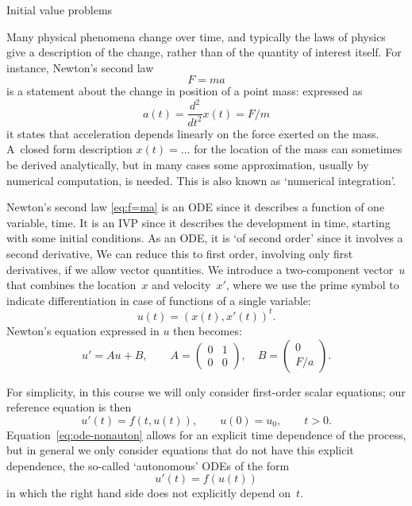  {Initial value problems}
\label{sec:ode}

Many physical phenomena change over time, and typically the laws of
physics give a description of the change, rather than of the quantity
of interest itself. For instance, Newton's second law
\begin{equation}
  F=ma
  \label{eq:f=ma}
\end{equation}
is a
statement about the change in position of a point mass: expressed as
\begin{equation}
  a(t)=\frac{d^2}{dt^2}x(t)=F/m
\end{equation}
it states that acceleration depends linearly on the force exerted on
the mass. A~closed form description $x(t)=\ldots$ for the location of
the mass can sometimes be
derived analytically, but in many cases some approximation,
usually by numerical computation, is needed.
This is also known as `numerical integration'.

Newton's second law \eqref{eq:f=ma} is an \ac{ODE} since it describes a function of one
variable, time. It is an \ac{IVP} since it describes the development
in time, starting with some initial conditions.  As an \ac{ODE}, it is
`of second order' since it involves a second derivative, We can reduce
this to first order, involving only first derivatives, if we allow
vector quantities. 
%
We introduce a two-component vector~$u$ that combines the location~$x$ and
velocity~$x'$, where
we use the
  prime symbol to indicate differentiation in case of functions of a
  single variable:
  \begin{equation}
    u(t)=(x(t),x'(t))^t.
  \end{equation}
Newton's equation expressed in $u$ then becomes:
\begin{equation}
  u'=Au+B,\qquad A=
\begin{pmatrix}
  0&1\\ 0& 0
\end{pmatrix},\quad B=
\begin{pmatrix}
  0\\ F/a
\end{pmatrix}.
\end{equation}

For simplicity, in this course we will only consider first-order scalar equations;
our reference equation is then
\begin{equation}
  u'(t)=f(t,u(t)),\qquad u(0)=u_0,\qquad t>0.
    \label{eq:ode-nonauton}
\end{equation}
Equation~\eqref{eq:ode-nonauton} allows for an explicit time dependence
of the process, but in general we only consider equations that 
do not have this explicit dependence,
the  so-called `autonomous'  \acp{ODE} of the form
\begin{equation}
  \label{eq:ode}
  u'(t)=f(u(t))
\end{equation}
in which the right hand side does not explicitly depend
on~$t$.


